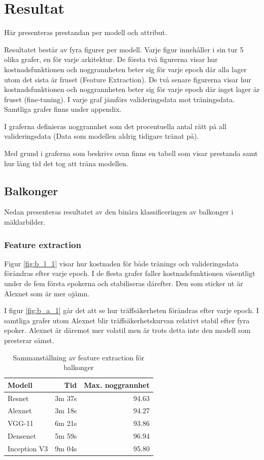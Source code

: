 \documentclass[]{kththesis}
\begin{document}
\chapter{Resultat}
Här presenteras prestandan per modell och attribut.

Resultatet består av fyra figurer per modell. 
Varje figur innehåller i sin tur 5 olika grafer, en för varje arkitektur.
De första två figurerna visar hur kostnadsfunktionen och noggrannheten beter sig för varje epoch där alla lager utom det sista är fruset (Feature Extraction).
De två senare figurerna visar hur kostnadsfunktionen och noggrannheten beter sig för varje epoch där inget lager är fruset (fine-tuning).
I varje graf jämförs valideringsdata mot träningsdata. Samtliga grafer finns under appendix.

I graferna definieras noggrannhet som det procentuella antal rätt på all valideringsdata (Data som modellen aldrig tidigare tränat på). 

Med grund i graferna som beskrivs ovan finns en tabell som visar prestanda samt hur lång tid det tog att träna modellen.

\section{Balkonger}
Nedan presenteras resultatet av den binära klassificeringen av balkonger i mäklarbilder.


\subsection{Feature extraction}
Figur \ref{fig:b_l_1} visar hur kostnaden för både tränings och valideringsdata förändras efter varje epoch. I de flesta grafer faller kostnadsfunktionen väsentligt under de fem första epokerna och stabiliseras därefter. Den som sticker ut är Alexnet som är mer ojämn.

I figur \ref{fig:b_a_1} går det att se hur träffsäkerheten förändras efter varje epoch.
I samtliga grafer utom Alexnet blir träffsäkerhetskurvan relativt stabil efter fyra epoker. Alexnet är däremot mer volatil men är trots detta inte den modell som presterar sämst.

\begin{table}[h]
  \centering
  \begin{tabular}{|l|r|r|}
    Modell & Tid & Max. noggrannhet \\ 
    \hline
    Resnet       & 3m 37s & 94.63 \\
    Alexnet      & 3m 18s & 94.27 \\
    VGG-11       & 6m 21s & 93.86 \\
    Densenet     & 5m 59s & 96.94 \\
    Inception V3 & 9m 04s & 95.80 \\
  \end{tabular}
  \caption{Sammanställning av feature extraction för balkonger}
  \label{fig:sam_1}
  
\end{table}
\end{document}
